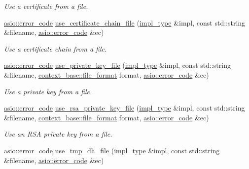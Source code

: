 \begin{DoxyCompactItemize}
\begin{DoxyCompactList}\small\item\em Use a certificate from a file. \end{DoxyCompactList}\item 
\hyperlink{classasio_1_1error__code}{asio\+::error\+\_\+code} \hyperlink{classasio_1_1ssl_1_1old_1_1context__service_a508092a5fd0b36856d2c143c87f592e9}{use\+\_\+certificate\+\_\+chain\+\_\+file} (\hyperlink{classasio_1_1ssl_1_1old_1_1context__service_aa082808edcf9f9da07eaf4077d1d8de0}{impl\+\_\+type} \&impl, const std\+::string \&filename, \hyperlink{classasio_1_1error__code}{asio\+::error\+\_\+code} \&ec)
\begin{DoxyCompactList}\small\item\em Use a certificate chain from a file. \end{DoxyCompactList}\item 
\hyperlink{classasio_1_1error__code}{asio\+::error\+\_\+code} \hyperlink{classasio_1_1ssl_1_1old_1_1context__service_a9f7aac09f70bdc8595058a2146b269ad}{use\+\_\+private\+\_\+key\+\_\+file} (\hyperlink{classasio_1_1ssl_1_1old_1_1context__service_aa082808edcf9f9da07eaf4077d1d8de0}{impl\+\_\+type} \&impl, const std\+::string \&filename, \hyperlink{classasio_1_1ssl_1_1context__base_acc846aa73fffcab1fecad36dcf2be1fb}{context\+\_\+base\+::file\+\_\+format} format, \hyperlink{classasio_1_1error__code}{asio\+::error\+\_\+code} \&ec)
\begin{DoxyCompactList}\small\item\em Use a private key from a file. \end{DoxyCompactList}\item 
\hyperlink{classasio_1_1error__code}{asio\+::error\+\_\+code} \hyperlink{classasio_1_1ssl_1_1old_1_1context__service_ae14e03797038ae7e97f6c17550b7b9dd}{use\+\_\+rsa\+\_\+private\+\_\+key\+\_\+file} (\hyperlink{classasio_1_1ssl_1_1old_1_1context__service_aa082808edcf9f9da07eaf4077d1d8de0}{impl\+\_\+type} \&impl, const std\+::string \&filename, \hyperlink{classasio_1_1ssl_1_1context__base_acc846aa73fffcab1fecad36dcf2be1fb}{context\+\_\+base\+::file\+\_\+format} format, \hyperlink{classasio_1_1error__code}{asio\+::error\+\_\+code} \&ec)
\begin{DoxyCompactList}\small\item\em Use an R\+S\+A private key from a file. \end{DoxyCompactList}\item 
\hyperlink{classasio_1_1error__code}{asio\+::error\+\_\+code} \hyperlink{classasio_1_1ssl_1_1old_1_1context__service_a26eeff8a9a4cdbff20d73be80aaaa7ba}{use\+\_\+tmp\+\_\+dh\+\_\+file} (\hyperlink{classasio_1_1ssl_1_1old_1_1context__service_aa082808edcf9f9da07eaf4077d1d8de0}{impl\+\_\+type} \&impl, const std\+::string \&filename, \hyperlink{classasio_1_1error__code}{asio\+::error\+\_\+code} \&ec)

\end{DoxyCompactItemize}
